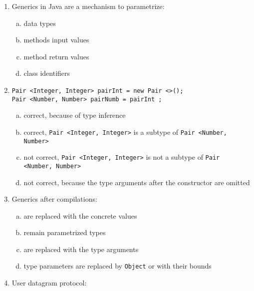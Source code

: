 \documentclass[10pt,a4paper,twocolumn]{article}
\begin{document}
	\thispagestyle{fancy}
	\fancyhf{}
\begin{enumerate}
\item Generics in Java are a mechanism to parametrize:
\begin{enumerate}[(a)]
	\item data types
	\item methods input values
	\item method return values
	\item class identifiers
\end{enumerate}
\item \begin{verbatim}
Pair <Integer, Integer> pairInt = new Pair <>();
Pair <Number, Number> pairNumb = pairInt ;
\end{verbatim}
\begin{enumerate}[(a)]
	\item correct, because of type inference
	\item correct, \texttt{Pair <Integer, Integer>} is a subtype of \texttt{Pair <Number, Number>}
	\item not correct, \texttt{Pair <Integer, Integer>} is not a subtype of \texttt{Pair <Number, Number>}
	\item not correct, because the type arguments after the constructor are omitted
\end{enumerate}
\item Generics after compilations:
\begin{enumerate}[(a)]
	\item are replaced with the concrete values
	\item remain parametrized types
	\item are replaced with the type arguments
	\item type parameters are replaced by \texttt{Object} or with their bounds
\end{enumerate}
\item User datagram protocol:
\begin{enumerate}[(a)]

\end{enumerate}
\end{enumerate}
\end{document}
